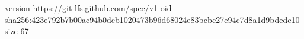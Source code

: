 version https://git-lfs.github.com/spec/v1
oid sha256:423e792b7b00ac94b0dcb1020473b96d68024e83bcbc27e94c7d8a1d9bdedc10
size 67
